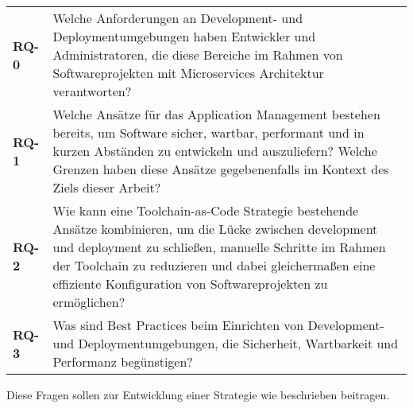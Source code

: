 \vspace{1em}
\begin{table}[H]
    \centering
    \begin{tabular}{p{} p{}}
        \textbf{RQ-0} & Welche Anforderungen an Development- und Deploymentumgebungen haben Entwickler und Administratoren, die diese Bereiche im Rahmen von Softwareprojekten mit Microservices Architektur verantworten? \\[2em]
        \textbf{RQ-1} & Welche Ansätze für das Application Management bestehen bereits, um Software sicher, wartbar, performant und in kurzen Abständen zu entwickeln und auszuliefern? Welche Grenzen haben diese Ansätze gegebenenfalls im Kontext des Ziels dieser Arbeit? \\[2em]
        \textbf{RQ-2} & Wie kann eine Toolchain-as-Code Strategie bestehende Ansätze kombinieren, um die Lücke zwischen \Gls{development} und \Gls{deployment} zu schließen, manuelle Schritte im Rahmen der Toolchain zu reduzieren und dabei gleichermaßen eine effiziente Konfiguration von Softwareprojekten zu ermöglichen? \\[2em]
        \textbf{RQ-3} & Was sind Best Practices beim Einrichten von Development- und Deploymentumgebungen, die Sicherheit, Wartbarkeit und Performanz begünstigen? \\
    \end{tabular}
\end{table}
\vspace{1em}

Diese Fragen sollen zur Entwicklung einer Strategie wie beschrieben beitragen.

